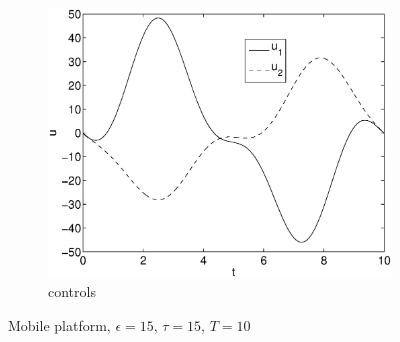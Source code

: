 \begin{figure}[h]
\begin{subfigure}[b]{\textwidth}
\centering
\includegraphics[height=0.3\textheight]{img/final_15_15_10_u.eps}
\caption{controls}
\end{subfigure}
\caption{Mobile platform, $\epsilon=15$, $\tau=15$, $T=10$}
\label{fig:pl3}
\end{figure}

